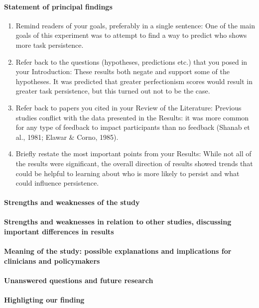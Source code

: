 	\paragraph{Statement of principal findings}
	\begin{enumerate}
		\item
			Remind readers of your goals, preferably in a single sentence:
			One of the main goals of this experiment was to attempt
			 to find a way to predict who shows more task persistence.
		\item
			Refer back to the questions (hypotheses, predictions etc.) 
			that you posed in your Introduction:
				These results both negate and support some of the hypotheses.
				It was predicted that greater perfectionism scores would result
				in greater task persistence, but this turned out not to be
				the case.
		\item
			Refer back to papers you cited in your Review of the Literature:
			Previous studies conflict with the data presented in the Results: 
			it was more common for any type of feedback to impact participants 
			than no feedback (Shanab et al., 1981; Elawar \&  Corno, 1985).
		\item
			Briefly restate the most important points from your Results:
			While not all of the results were significant, 
			the overall direction of results showed trends 
			that could be helpful to learning about who is more 
			likely to persist and what could influence persistence.
	\end{enumerate}

	\paragraph{Strengths and weaknesses of the study}
	\paragraph{Strengths and weaknesses in relation 
		to other studies, discussing important
		differences in results}
	\paragraph{Meaning of the study: possible explanations 
	and implications for clinicians
	and policymakers}
	\paragraph{Unanswered questions and future research}

\paragraph{Highligting our finding}